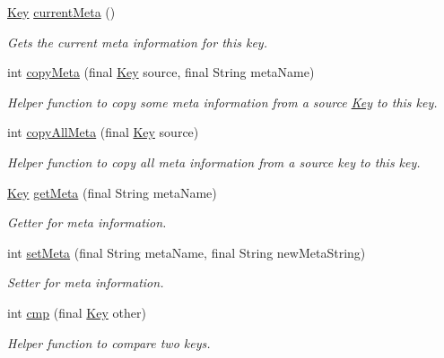 \begin{DoxyCompactItemize}
\mbox{\hyperlink{classorg_1_1libelektra_1_1Key}{Key}} \mbox{\hyperlink{classorg_1_1libelektra_1_1Key_af6a740822cebbda1e500093c4d69c5f8}{current\+Meta}} ()
\begin{DoxyCompactList}\small\item\em Gets the current meta information for this key. \end{DoxyCompactList}\item 
int \mbox{\hyperlink{classorg_1_1libelektra_1_1Key_a421a4240ce01f2f196bdce7b3c1d02c2}{copy\+Meta}} (final \mbox{\hyperlink{classorg_1_1libelektra_1_1Key}{Key}} source, final String meta\+Name)
\begin{DoxyCompactList}\small\item\em Helper function to copy some meta information from a source \mbox{\hyperlink{classorg_1_1libelektra_1_1Key}{Key}} to this key. \end{DoxyCompactList}\item 
int \mbox{\hyperlink{classorg_1_1libelektra_1_1Key_a9483ae832c9c16e4d68ed1c26babe2ce}{copy\+All\+Meta}} (final \mbox{\hyperlink{classorg_1_1libelektra_1_1Key}{Key}} source)
\begin{DoxyCompactList}\small\item\em Helper function to copy all meta information from a source key to this key. \end{DoxyCompactList}\item 
\mbox{\hyperlink{classorg_1_1libelektra_1_1Key}{Key}} \mbox{\hyperlink{classorg_1_1libelektra_1_1Key_a49d5d04f67917075c7b1513249777ccf}{get\+Meta}} (final String meta\+Name)
\begin{DoxyCompactList}\small\item\em Getter for meta information. \end{DoxyCompactList}\item 
int \mbox{\hyperlink{classorg_1_1libelektra_1_1Key_ac8c73ca3d16cf4454bd326ebe469cf2d}{set\+Meta}} (final String meta\+Name, final String new\+Meta\+String)
\begin{DoxyCompactList}\small\item\em Setter for meta information. \end{DoxyCompactList}\item 
int \mbox{\hyperlink{classorg_1_1libelektra_1_1Key_aa5271913871c1ee2f31f32190a7e14aa}{cmp}} (final \mbox{\hyperlink{classorg_1_1libelektra_1_1Key}{Key}} other)
\begin{DoxyCompactList}\small\item\em Helper function to compare two keys. \end{DoxyCompactList}\item 

\end{DoxyCompactItemize}
